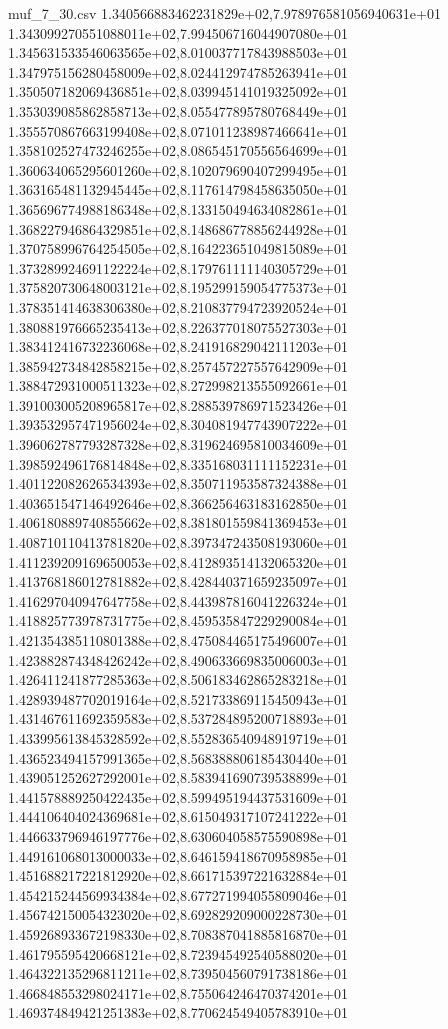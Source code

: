 \begin{filecontents*}{muf_7_30.csv}
1.340566883462231829e+02,7.978976581056940631e+01
1.343099270551088011e+02,7.994506716044907080e+01
1.345631533546063565e+02,8.010037717843988503e+01
1.347975156280458009e+02,8.024412974785263941e+01
1.350507182069436851e+02,8.039945141019325092e+01
1.353039085862858713e+02,8.055477895780768449e+01
1.355570867663199408e+02,8.071011238987466641e+01
1.358102527473246255e+02,8.086545170556564699e+01
1.360634065295601260e+02,8.102079690407299495e+01
1.363165481132945445e+02,8.117614798458635050e+01
1.365696774988186348e+02,8.133150494634082861e+01
1.368227946864329851e+02,8.148686778856244928e+01
1.370758996764254505e+02,8.164223651049815089e+01
1.373289924691122224e+02,8.179761111140305729e+01
1.375820730648003121e+02,8.195299159054775373e+01
1.378351414638306380e+02,8.210837794723920524e+01
1.380881976665235413e+02,8.226377018075527303e+01
1.383412416732236068e+02,8.241916829042111203e+01
1.385942734842858215e+02,8.257457227557642909e+01
1.388472931000511323e+02,8.272998213555092661e+01
1.391003005208965817e+02,8.288539786971523426e+01
1.393532957471956024e+02,8.304081947743907222e+01
1.396062787793287328e+02,8.319624695810034609e+01
1.398592496176814848e+02,8.335168031111152231e+01
1.401122082626534393e+02,8.350711953587324388e+01
1.403651547146492646e+02,8.366256463183162850e+01
1.406180889740855662e+02,8.381801559841369453e+01
1.408710110413781820e+02,8.397347243508193060e+01
1.411239209169650053e+02,8.412893514132065320e+01
1.413768186012781882e+02,8.428440371659235097e+01
1.416297040947647758e+02,8.443987816041226324e+01
1.418825773978731775e+02,8.459535847229290084e+01
1.421354385110801388e+02,8.475084465175496007e+01
1.423882874348426242e+02,8.490633669835006003e+01
1.426411241877285363e+02,8.506183462865283218e+01
1.428939487702019164e+02,8.521733869115450943e+01
1.431467611692359583e+02,8.537284895200718893e+01
1.433995613845328592e+02,8.552836540948919719e+01
1.436523494157991365e+02,8.568388806185430440e+01
1.439051252627292001e+02,8.583941690739538899e+01
1.441578889250422435e+02,8.599495194437531609e+01
1.444106404024369681e+02,8.615049317107241222e+01
1.446633796946197776e+02,8.630604058575590898e+01
1.449161068013000033e+02,8.646159418670958985e+01
1.451688217221812920e+02,8.661715397221632884e+01
1.454215244569934384e+02,8.677271994055809046e+01
1.456742150054323020e+02,8.692829209000228730e+01
1.459268933672198330e+02,8.708387041885816870e+01
1.461795595420668121e+02,8.723945492540588020e+01
1.464322135296811211e+02,8.739504560791738186e+01
1.466848553298024171e+02,8.755064246470374201e+01
1.469374849421251383e+02,8.770624549405783910e+01

\end{filecontents*}
